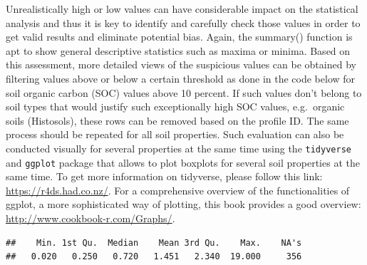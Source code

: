 \documentclass[
  10pt,
  b5paper,
  oneside]{book}
\newenvironment{Shaded}{\begin{snugshade}}{\end{snugshade}}
\newcommand{\CommentTok}[1]{\textcolor[rgb]{0.56,0.35,0.01}{\textit{#1}}}
\newcommand{\DecValTok}[1]{\textcolor[rgb]{0.00,0.00,0.81}{#1}}
\newcommand{\DocumentationTok}[1]{\textcolor[rgb]{0.56,0.35,0.01}{\textbf{\textit{#1}}}}
\newcommand{\FunctionTok}[1]{\textcolor[rgb]{0.00,0.00,0.00}{#1}}
\newcommand{\NormalTok}[1]{#1}
\newcommand{\SpecialCharTok}[1]{\textcolor[rgb]{0.00,0.00,0.00}{#1}}
\begin{document}
Unrealistically high or low values can have considerable impact on the statistical analysis and thus it is key to identify and carefully check those values in order to get valid results and eliminate potential bias. Again, the summary() function is apt to show general descriptive statistics such as maxima or minima. Based on this assessment, more detailed views of the suspicious values can be obtained by filtering values above or below a certain threshold as done in the code below for soil organic carbon (SOC) values above 10 percent. If such values don't belong to soil types that would justify such exceptionally high SOC values, e.g.~organic soils (Histosols), these rows can be removed based on the profile ID. The same process should be repeated for all soil properties.
Such evaluation can also be conducted visually for several properties at the same time using the \texttt{tidyverse} and \texttt{ggplot} package that allows to plot boxplots for several soil properties at the same time. To get more information on tidyverse, please follow this link: \url{https://r4ds.had.co.nz/}. For a comprehensive overview of the functionalities of ggplot, a more sophisticated way of plotting, this book provides a good overview: \url{http://www.cookbook-r.com/Graphs/}.

\begin{Shaded}
\end{Shaded}

\begin{verbatim}
##    Min. 1st Qu.  Median    Mean 3rd Qu.    Max.    NA's 
##   0.020   0.250   0.720   1.451   2.340  19.000     356
\end{verbatim}

\begin{Shaded}
\end{Shaded}
\end{document}
